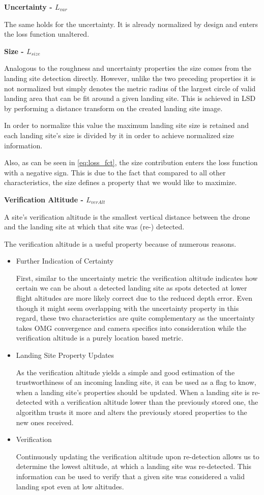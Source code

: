 \textbf{Uncertainty - $L_{var}$}

The same holds for the uncertainty. It is already normalized by design and enters the loss function unaltered.

\textbf{Size - $L_{size}$}

Analogous to the roughness and uncertainty properties the size comes from the landing site detection directly. However, unlike the two preceding properties it is not normalized but simply denotes the metric radius of the largest circle of valid landing area that can be fit around a given landing site. This is achieved in LSD by performing a distance transform on the created landing site image.

In order to normalize this value the maximum landing site size is retained and each landing site's size is divided by it in order to achieve normalized size information.

Also, as can be seen in \cref{eq:loss_fct}, the size contribution enters the loss function with a negative sign. This is due to the fact that compared to all other characteristics, the size defines a property that we would like to maximize.

\textbf{Verification Altitude - $L_{verAlt}$}\label{subsubsec:ver_alt}

A site's verification altitude is the smallest vertical distance between the drone and the landing site at which that site was (re-) detected. 

The verification altitude is a useful property because of numerous reasons.
\begin{itemize}
    \item Further Indication of Certainty

    First, similar to the uncertainty metric the verification altitude indicates how certain we can be about a detected landing site as spots detected at lower flight altitudes are more likely correct due to the reduced depth error. Even though it might seem overlapping with the uncertainty property in this regard, these two characteristics are quite complementary as the uncertainty takes OMG convergence and camera specifics into consideration while the verification altitude is a purely location based metric.
    \item Landing Site Property Updates

    As the verification altitude yields a simple and good estimation of the trustworthiness of an incoming landing site, it can be used as a flag to know, when a landing site's properties should be updated. When a landing site is re-detected with a verification altitude lower than the previously stored one, the algorithm trusts it more and alters the previously stored properties to the new ones received.
    \item Verification

    Continuously updating the verification altitude upon re-detection allows us to determine the lowest altitude, at which a landing site was re-detected. This information can be used to verify that a given site was considered a valid landing spot even at low altitudes. 
\end{itemize}

